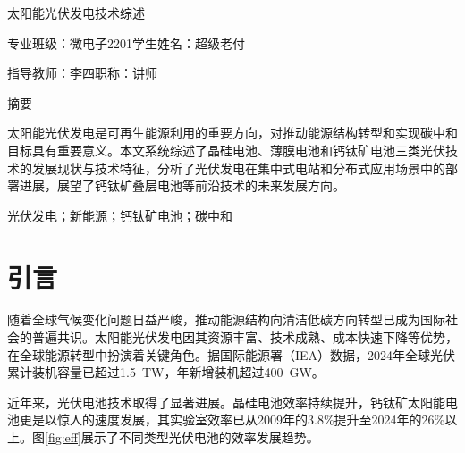 \documentclass[12pt,a4paper]{ctexart}
\begin{document}
\thispagestyle{empty}
\begin{center}
    \vspace*{2cm}
    
    {\heiti{} 太阳能光伏发电技术综述}
    
    \vspace{3cm}
    
    {\songti{}
    专业班级：微电子2201\hspace{3em}学生姓名：超级老付
    
    \vspace{0.5cm}
    
    指导教师：李四\hspace{4.5em}职\quad 称：讲师
    }
\end{center}

\vspace{1cm}

\begin{center}
    {\heiti{} 摘\quad 要}
\end{center}

太阳能光伏发电是可再生能源利用的重要方向，对推动能源结构转型和实现碳中和目标具有重要意义。本文系统综述了晶硅电池、薄膜电池和钙钛矿电池三类光伏技术的发展现状与技术特征，分析了光伏发电在集中式电站和分布式应用场景中的部署进展，展望了钙钛矿叠层电池等前沿技术的未来发展方向。

\vspace{12bp}
 光伏发电；新能源；钙钛矿电池；碳中和

\newpage
\tableofcontents

\newpage

\section{引言}

随着全球气候变化问题日益严峻，推动能源结构向清洁低碳方向转型已成为国际社会的普遍共识。太阳能光伏发电因其资源丰富、技术成熟、成本快速下降等优势，在全球能源转型中扮演着关键角色。据国际能源署（IEA）数据，2024年全球光伏累计装机容量已超过1.5~TW，年新增装机超过400~GW\cite{ref1}。

近年来，光伏电池技术取得了显著进展。晶硅电池效率持续提升，钙钛矿太阳能电池更是以惊人的速度发展，其实验室效率已从2009年的3.8\%提升至2024年的26\%以上\cite{ref2}。图\ref{fig:eff}展示了不同类型光伏电池的效率发展趋势。
\end{document}

